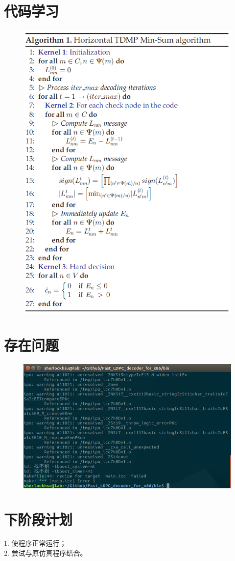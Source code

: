 \documentclass{article}
\begin{document}
\section{代码学习}
\begin{figure}[H]
	\centering
	\includegraphics[width = .6\textwidth]{alg.png}
\end{figure}

\section{存在问题}
\begin{figure}[H]
	\centering
	\includegraphics[width = .8\textwidth]{err.png}
\end{figure}



\section{下阶段计划}
1. 使程序正常运行；\\
2. 尝试与原仿真程序结合。
\end{document}

